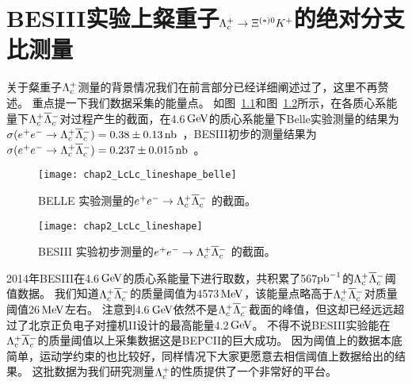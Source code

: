 \chapter{BESIII实验上粲重子$\Lambda_{c}^{+}\rightarrow \Xi^{(*)0}K^{+}$的绝对分支比测量}
\label{chap:lambdac}

关于粲重子$\Lambda_{c}^{+}$测量的背景情况我们在前言部分已经详细阐述过了，这里不再赘述。
重点提一下我们数据采集的能量点。
如图~\ref{fig:lambc_cs_belle}和图~\ref{fig:lambc_cs_bes3}所示，在各质心系能量下$\Lambda_{c}^{+}\overline{\Lambda}{}_{c}^{-}$对过程产生的截面，在4.6$\mathrm{\,Ge\kern -0.1em V}$的质心系能量下Belle实验测量的结果为$\sigma(e^+e^-\rightarrow\Lambda_{c}^{+}\overline{\Lambda}{}_{c}^{-})=0.38\pm0.13\,\rm{nb}$~\cite{Pakhlova:2008vn}，BESIII初步的测量结果为$\sigma(e^+e^-\rightarrow\Lambda_{c}^{+}\overline{\Lambda}{}_{c}^{-})=0.237\pm0.015\,\rm{nb}$~\cite{Ablikim:2017lct}。

\begin{figure*}[h]
\centering
\texttt{[image: chap2\_LcLc\_lineshape\_belle]}
\caption{ BELLE 实验测量的$e^+e^-\rightarrow\Lambda_{c}^{+}\overline{\Lambda}{}_{c}^{-}$ 的截面。}
\label{fig:lambc_cs_belle}
\end{figure*}

\begin{figure*}[h]
\centering
\texttt{[image: chap2\_LcLc\_lineshape]}
\caption{ BESIII 实验初步测量的$e^+e^-\rightarrow\Lambda_{c}^{+}\overline{\Lambda}{}_{c}^{-}$ 的截面。}
\label{fig:lambc_cs_bes3}
\end{figure*}
2014年BESIII在4.6$\mathrm{\,Ge\kern -0.1em V}$的质心系能量下进行取数，共积累了567$\rm{pb}^{-1}$的$\Lambda_{c}^{+}\overline{\Lambda}{}_{c}^{-}$阈值数据。
我们知道$\Lambda_{c}^{+}\overline{\Lambda}{}_{c}^{-}$的质量阈值为4573$\mathrm{\,Me\kern -0.1em V}$，该能量点略高于$\Lambda_{c}^{+}\overline{\Lambda}{}_{c}^{-}$对质量阈值26$\mathrm{\,Me\kern -0.1em V}$左右。
注意到4.6$\mathrm{\,Ge\kern -0.1em V}$依然不是$\Lambda_{c}^{+}\overline{\Lambda}{}_{c}^{-}$截面的峰值，但这却已经远远超过了北京正负电子对撞机II设计的最高能量4.2$\mathrm{\,Ge\kern -0.1em V}$。
不得不说BESIII实验能在$\Lambda_{c}^{+}\overline{\Lambda}{}_{c}^{-}$的质量阈值以上采集数据这是BEPCII的巨大成功。
因为阈值上的数据本底简单，运动学约束的也比较好，同样情况下大家更愿意去相信阈值上数据给出的结果。
这批数据为我们研究测量$\Lambda_{c}^{+}$的性质提供了一个非常好的平台。

